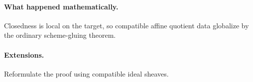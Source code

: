 \paragraph{What happened mathematically.}
Closedness is local on the target, so compatible affine quotient data globalize by the ordinary scheme-gluing theorem.

\paragraph{Extensions.}
Reformulate the proof using compatible ideal sheaves.
\fi
